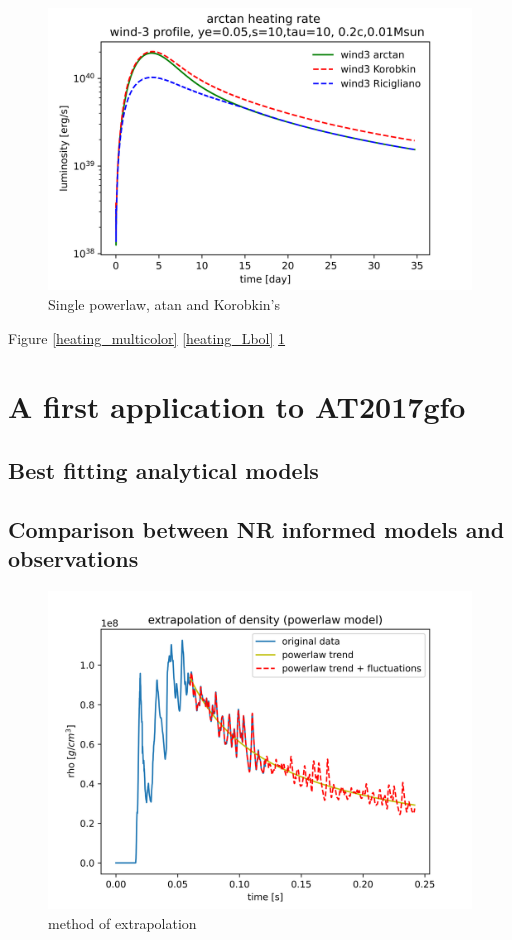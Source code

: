 \documentclass[fleqn,usenatbib]{mnras}
\begin{document}
\begin{figure}
\centering
\includegraphics[scale=0.5]{figures/heating/wind3_arctan_heating}
\caption{Single powerlaw, atan and Korobkin's}
\label{test_heating_rates}
\end{figure}

Figure \ref{heating_multicolor} \ref{heating_Lbol} \ref{test_heating_rates}

\section{A first application to AT2017gfo}
\subsection{Best fitting analytical models}
\subsection{Comparison between NR informed models and observations}

\begin{figure}
\centering
\includegraphics[scale=0.5]{figures/blh_sfho_extrapolation/extrapolation_of_density}
\caption{method of extrapolation}
\label{method_of_extrapolation}
\end{figure}
\end{document}
